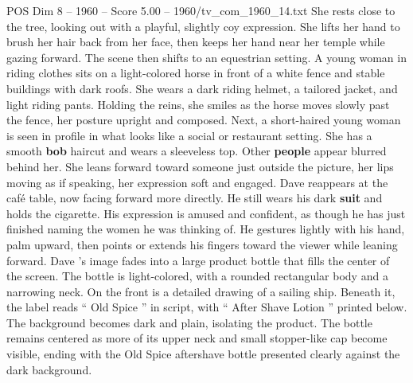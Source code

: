 \begin{textsample}{POS Dim 8 – 1960 – Score 5.00 – 1960/tv\_com\_1960\_14.txt}
She rests close to the tree, looking out with a playful, slightly coy expression.
She lifts her hand to brush her hair back from her face, then keeps her hand near her temple while gazing forward.
The scene then shifts to an equestrian setting.
A young woman in riding clothes sits on a light-colored horse in front of a white fence and stable buildings with dark roofs.
She wears a dark riding helmet, a tailored jacket, and light riding pants.
Holding the reins, she smiles as the horse moves slowly past the fence, her posture upright and composed.
Next, a short-haired young woman is seen in profile in what looks like a social or restaurant setting.
She has a smooth \textbf{bob} haircut and wears a sleeveless top.
Other \textbf{people} appear blurred behind her.
She leans forward toward someone just outside the picture, her lips moving as if speaking, her expression soft and engaged.
Dave reappears at the café table, now facing forward more directly.
He still wears his dark \textbf{suit} and holds the cigarette.
His expression is amused and confident, as though he has just finished naming the women he was thinking of.
He gestures lightly with his hand, palm upward, then points or extends his fingers toward the viewer while leaning forward.
Dave ’s image fades into a large product bottle that fills the center of the screen.
The bottle is light-colored, with a rounded rectangular body and a narrowing neck.
On the front is a detailed drawing of a sailing ship.
Beneath it, the label reads “ Old Spice ” in script, with “ After Shave Lotion ” printed below.
The background becomes dark and plain, isolating the product.
The bottle remains centered as more of its upper neck and small stopper-like cap become visible, ending with the Old Spice aftershave bottle presented clearly against the dark background.

\end{textsample}
